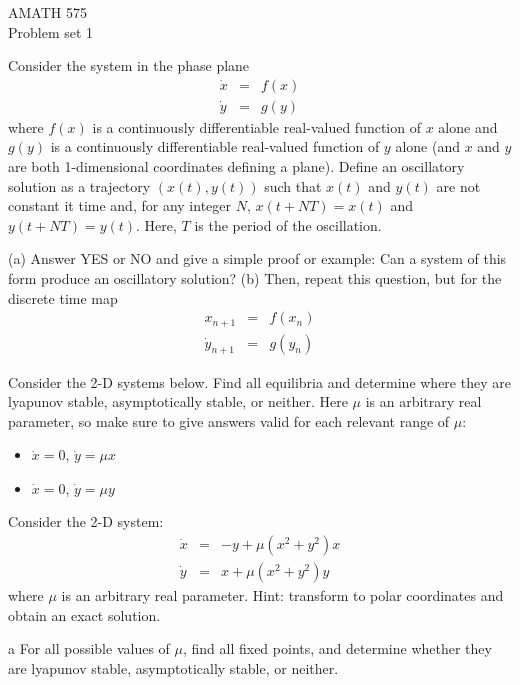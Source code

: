 \documentclass{article}
\newcommand{\bei}{\begin{itemize}}
\newcommand{\eei}{\end{itemize}}
\begin{document}
\begin{center}
AMATH 575 \\
Problem set 1\\[.3in]
\end{center}



\begin{list}
   {}
    {\setlength{\rightmargin}{\leftmargin}}

\item Consider the system in the phase plane
\begin{eqnarray*} 
	\dot x &=& f(x) \\
	\dot y &=& g(y) 
\end{eqnarray*} 
where $f(x)$ is a continuously differentiable real-valued function of $x$ alone and $g(y)$ is a continuously differentiable real-valued function of $y$ alone (and $x$ and $y$ are both 1-dimensional coordinates defining a plane).  Define an oscillatory solution as a trajectory $(x(t), y(t))$ such that $x(t)$ and $y(t)$ are not constant it time and, for any integer $N$, $x(t+N T) = x(t)$ and $y(t+N T) = y(t)$.  Here, $T$ is the period of the oscillation.

\smallskip 
(a) Answer YES or NO and give a simple proof or example:  Can a system of this form produce an oscillatory solution?  (b) Then, repeat this question, but for the discrete time map 
\begin{eqnarray*} 	x_{n+1} &=& f(x_n) \\
	\dot y_{n+1} &=& g(y_n) 
\end{eqnarray*}

\item Consider the 2-D systems below.  Find all equilibria and determine where they are lyapunov stable, asymptotically stable, or neither.  Here $\mu$ is an arbitrary real parameter, so make sure to give answers valid for each relevant range of $\mu$:
    \bei
    \item $\dot x = 0$, $\dot y = \mu x$ 
    \item $\dot x = 0$, $\dot y = \mu y$ 
    \eei


\item Consider the 2-D system:
\begin{eqnarray*} 
	\dot x &=& -y + \mu (x^2 + y^2)x  \\
	\dot y &=& x + \mu (x^2 + y^2) y
\end{eqnarray*}
where $\mu$ is an arbitrary real parameter.  Hint:  transform to polar coordinates and obtain an exact solution.
\item[a]  For all possible values of $\mu$, find all fixed points, and determine whether they are lyapunov stable, asymptotically stable, or neither.


\end{list}
\end{document}
